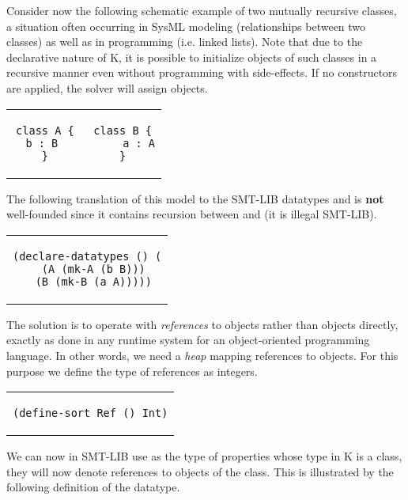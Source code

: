 Consider now the following schematic example of two mutually recursive
classes, a situation often occurring in SysML modeling (relationships
between two classes) as well as in programming (i.e. linked lists).
Note that due to the declarative nature of K, it is possible to initialize
objects of such classes in a recursive manner even without programming with side-effects.
If no constructors are applied, the solver will assign objects.

\lstset{language=K,numbers=none}

\begin{center}
\begin{tabular}{c}
\small
\begin{lstlisting}
class A {   class B {
  b : B          a : A
}           }
\end{lstlisting}
\end{tabular}
\end{center}

\noindent The following translation of this model to the SMT-LIB datatypes
 and  is {\bf not} well-founded since it contains
recursion between  and  (it is illegal SMT-LIB).

\lstset{language=SMT,numbers=none}

\begin{center}
\begin{tabular}{c}
\small
\begin{lstlisting}
(declare-datatypes () (
  (A (mk-A (b B)))
  (B (mk-B (a A)))))
\end{lstlisting}
\end{tabular}
\end{center}

\noindent The solution is to operate with {\em references} to objects rather
than objects directly, exactly as done in any runtime system for an
object-oriented programming language. In other words, we need a {\em
  heap} mapping references to objects. For this purpose we define
the type of references as integers.

\begin{center}
\begin{tabular}{c}
\small
\begin{lstlisting}
(define-sort Ref () Int)
\end{lstlisting}
\end{tabular}
\end{center}

\noindent We can now in SMT-LIB use  as the type of properties whose 
type in K is a class, they will now denote references to objects of the class.
This is illustrated by the following definition of the  datatype.

